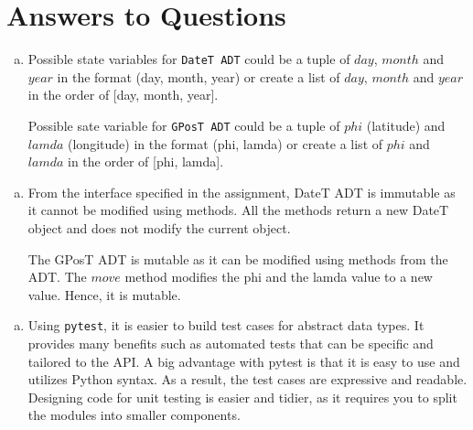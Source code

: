 \documentclass[12pt]{article}
\begin{document}
\section{Answers to Questions}

\begin{enumerate}[(a)]

\item Possible state variables for \texttt{DateT ADT} could be a tuple of $day$, $month$ and $year$ in the format (day, month, year) or create a list of $day$, $month$ and $year$ in the order of [day, month, year].

Possible sate variable for \texttt{GPosT ADT} could be a tuple of $phi$ (latitude) and $lamda$ (longitude) in the format (phi, lamda) or create a list of $phi$ and $lamda$ in the order of [phi, lamda].

\end{enumerate}

\begin{enumerate}[(b)]

\item From the interface specified in the assignment, DateT ADT is immutable as it cannot be modified using methods. All the methods return a new DateT object and does not modify the current object.

The GPosT ADT is mutable as it can be modified using methods from the ADT. The $move$ method modifies the phi and the lamda value to a new value. Hence, it is mutable.

\end{enumerate}

\begin{enumerate}[(c)]

\item Using \texttt{pytest}, it is easier to build test cases for abstract data types. It provides many benefits such as automated tests that can be specific and tailored to the API. A big advantage with pytest is that it is easy to use and utilizes Python syntax. As a result, the test cases are expressive and readable. Designing code for unit testing is easier and tidier, as it requires you to split the modules into smaller components.

\end{enumerate}
\end{document}
